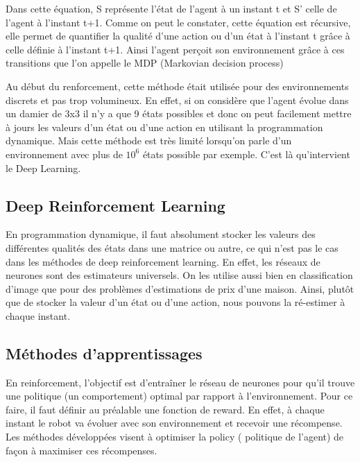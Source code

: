 Dans cette équation, S représente l’état de l’agent à un instant t et S’ celle de l’agent à l’instant t+1. Comme on peut le constater, cette équation est récursive, elle permet de quantifier la qualité d'une action ou d'un état à l'instant t grâce à celle définie à l'instant t+1.
Ainsi l'agent perçoit son environnement grâce à ces transitions que l'on appelle le MDP (Markovian decision process)

Au début du renforcement, cette méthode était utilisée pour des environnements discrets et pas trop volumineux. En effet, si on considère que l’agent évolue dans un damier de 3x3 il n’y a que 9 états possibles et donc on peut facilement mettre à jours les valeurs d’un état ou d’une action en utilisant la programmation dynamique.
Mais cette méthode est très limité lorsqu’on parle d’un environnement avec plus de $10^{6}$ états possible par exemple.
C’est là qu'intervient le Deep Learning.

\subsection{Deep Reinforcement Learning}

En programmation dynamique, il faut absolument stocker les valeurs des différentes qualités des états dans une matrice ou autre, ce qui n’est pas le cas dans les méthodes de deep reinforcement learning.
En effet, les réseaux de neurones sont des estimateurs universels. On les utilise aussi bien en classification d’image que pour des problèmes d’estimations de prix d’une maison.
Ainsi, plutôt que de stocker la valeur d’un état ou d’une action, nous pouvons la ré-estimer à chaque instant.

\subsection{Méthodes d'apprentissages}

En reinforcement, l’objectif est d'entraîner le réseau de neurones pour qu’il trouve une politique (un comportement) optimal par rapport à l’environnement.
Pour ce faire, il faut définir au préalable une fonction de reward. En effet, à chaque instant le robot va évoluer avec son environnement et recevoir une récompense. 
Les méthodes développées visent à optimiser la policy ( politique de l’agent) de façon à maximiser ces récompenses.

